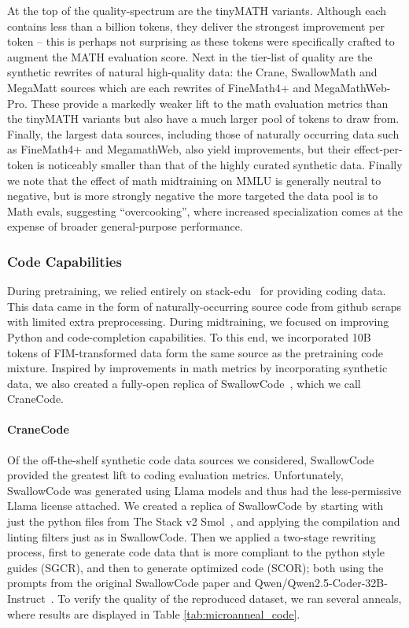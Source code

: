 \documentclass[table]{ai2style/ai2}
\begin{document}
{{At the top of the quality-spectrum are the tinyMATH variants. Although each contains less than a billion tokens, they deliver the strongest improvement per token -- this is perhaps not surprising as these tokens were specifically crafted to augment the MATH evaluation score. Next in the tier-list of quality are the synthetic rewrites of natural high-quality data: the Crane, SwallowMath and MegaMatt sources which are each rewrites of FineMath4+ and MegaMathWeb-Pro. These provide a markedly weaker lift to the math evaluation metrics than the tinyMATH variants but also have a much larger pool of tokens to draw from. Finally, the largest data sources, including those of naturally occurring data such as FineMath4+ and MegamathWeb, also yield improvements, but their effect-per-token is noticeably smaller than that of the highly curated synthetic data. Finally we note that the effect of math midtraining on MMLU is generally neutral to negative, but is more strongly negative the more targeted the data pool is to Math evals, suggesting ``overcooking'', where increased specialization comes at the expense of broader general-purpose performance.

\subsubsection{Code Capabilities}
During pretraining, we relied entirely on stack-edu~\citep{allal2025smollm2smolgoesbig} for providing coding data. This data came in the form of naturally-occurring source code from github scraps with limited extra preprocessing. During midtraining, we focused on improving Python and code-completion capabilities. To this end, we incorporated 10B tokens of FIM-transformed data form the same source as the pretraining code mixture. Inspired by improvements in math metrics by incorporating synthetic data, we also created a fully-open replica of SwallowCode~\citep{fujii2025rewriting}, which we call CraneCode.

\paragraph{CraneCode}
Of the off-the-shelf synthetic code data sources we considered, SwallowCode provided the greatest lift to coding evaluation metrics. Unfortunately, SwallowCode was generated using Llama models and thus had the less-permissive Llama license attached. We created a replica of SwallowCode by starting with just the python files from The Stack v2 Smol~\citep{lozhkov2024starcoder}, and applying the compilation and linting filters just as in SwallowCode. Then we applied a two-stage rewriting process, first to generate code data that is more compliant to the python style guides (SGCR), and then to generate optimized code (SCOR); both using the prompts from the original SwallowCode paper and Qwen/Qwen2.5-Coder-32B-Instruct~\citep{qwen2.5}. To verify the quality of the reproduced dataset, we ran several anneals, where results are displayed in Table \ref{tab:microanneal_code}.

}}
\end{document}
